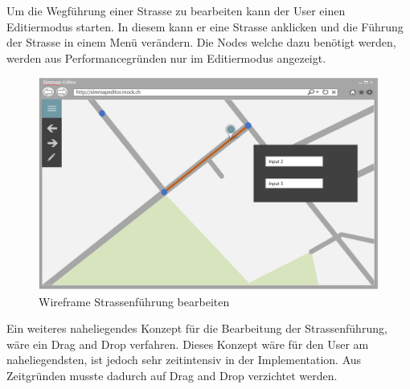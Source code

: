\noindent
\newpage
Um die Wegführung einer Strasse zu bearbeiten kann der User einen Editiermodus starten. In diesem kann er eine Strasse anklicken und die Führung der Strasse in einem Menü verändern. Die Nodes welche dazu benötigt werden, werden aus Performancegründen nur im Editiermodus angezeigt. 
\begin{figure}[H]
\centering
\includegraphics[height=7cm]{images/KonzeptChangeStreet.PNG}
\caption{Wireframe Strassenführung bearbeiten}
\label{fig:concepteditStreet}
\end{figure}
\noindent
Ein weiteres naheliegendes Konzept für die Bearbeitung der Strassenführung, wäre ein Drag and Drop verfahren. Dieses Konzept wäre für den User am naheliegendsten, ist jedoch sehr zeitintensiv in der Implementation. Aus Zeitgründen musste dadurch auf Drag and Drop verzichtet werden.
